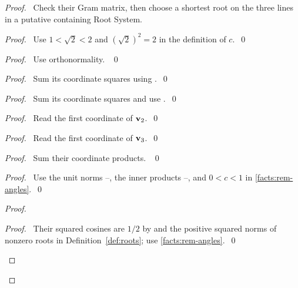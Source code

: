 \begin{proof}
\pfsketch\ Check their Gram matrix, then choose a shortest root on the
three lines in a putative containing Root System.
\begin{proof}\pf\ Use $1<\sqrt2<2$ and $(\sqrt2)^2=2$ in the definition of $c$.~\qed\end{proof}
\begin{proof}\pf\ Use orthonormality. ~\qed\end{proof}
\begin{proof}\pf\ Sum its coordinate squares using .~\qed\end{proof}
\begin{proof}\pf\ Sum its coordinate squares and use .~\qed\end{proof}
\begin{proof}\pf\ Read the first coordinate of ${\mathbf v}_2$.~\qed\end{proof}
\begin{proof}\pf\ Read the first coordinate of ${\mathbf v}_3$.~\qed\end{proof}
\begin{proof}\pf\ Sum their coordinate products. ~\qed\end{proof}
\begin{proof}\pf\ Use the unit norms --,
the inner products --, and
$0<c<1$ in \ref{facts:rem-angles}.~\qed\end{proof}
\begin{proof}
\begin{proof}\pf\ Their squared cosines are $1/2$ by 
and the positive squared norms of nonzero roots in
Definition~\ref{def:roots}; use \ref{facts:rem-angles}.~\qed\end{proof}

\end{proof}
\end{proof}
